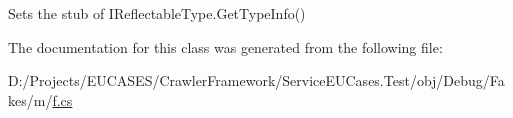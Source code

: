 Sets the stub of I\-Reflectable\-Type.\-Get\-Type\-Info()



The documentation for this class was generated from the following file\-:\begin{DoxyCompactItemize}
\item 
D\-:/\-Projects/\-E\-U\-C\-A\-S\-E\-S/\-Crawler\-Framework/\-Service\-E\-U\-Cases.\-Test/obj/\-Debug/\-Fakes/m/\hyperlink{m_2f_8cs}{f.\-cs}\end{DoxyCompactItemize}
